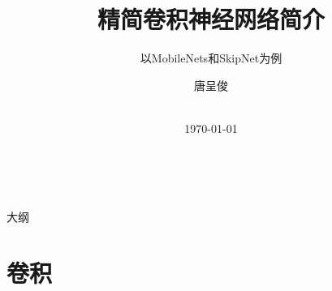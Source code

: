 \documentclass[UTF8, fontset=founder, aspectratio=43, 10pt, t]{ctexbeamer}
\begin{document}
	


\newcommand{\balA}[1][1]{BAL$^\mathup{I}_{#1:#1}$\xspace}
\newcommand{\unbalA}[1][n]{UNBAL$^\mathup{I}_{1:#1}$\xspace}
\newcommand{\balB}[1][1]{BAL$^\mathup{II}_{#1:#1}$\xspace}
\newcommand{\unbalB}[1][n]{UNBAL$^\mathup{II}_{#1:1}$\xspace}



\title{精简卷积神经网络简介}

\subtitle{以MobileNets和SkipNet为例}

\author[唐呈俊]{%
	唐呈俊
} %


\date{%
	\\[\medskipamount]
	\textmd{\today}%
}






\begin{frame}[standout]{~}
	
	\titlepage%
	
\end{frame}


\begin{frame}[standout]{大纲}
	
	\medskip
	\tableofcontents
	
\end{frame}






\section{卷积}
\end{document}
